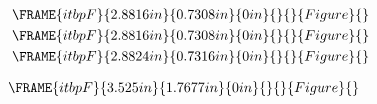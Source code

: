 \documentclass[notes=show]{beamer}
\begin{document}
\begin{frame}%

%
\begin{eqnarray*}
&&\FRAME{itbpF}{2.8816in}{0.7308in}{0in}{}{}{Figure}{\special{language
"Scientific Word";type "GRAPHIC";maintain-aspect-ratio TRUE;display
"USEDEF";valid_file "T";width 2.8816in;height 0.7308in;depth
0in;original-width 7.1356in;original-height 1.759in;cropleft "0";croptop
"1";cropright "1";cropbottom "0";tempfilename
'PEZY6C0A.wmf';tempfile-properties "XPR";}} \\
&&\FRAME{itbpF}{2.8816in}{0.7308in}{0in}{}{}{Figure}{\special{language
"Scientific Word";type "GRAPHIC";maintain-aspect-ratio TRUE;display
"USEDEF";valid_file "T";width 2.8816in;height 0.7308in;depth
0in;original-width 7.1373in;original-height 1.759in;cropleft "0";croptop
"1";cropright "1";cropbottom "0";tempfilename
'PEZY6R0B.wmf';tempfile-properties "XPR";}} \\
&&\FRAME{itbpF}{2.8824in}{0.7316in}{0in}{}{}{Figure}{\special{language
"Scientific Word";type "GRAPHIC";maintain-aspect-ratio TRUE;display
"USEDEF";valid_file "T";width 2.8824in;height 0.7316in;depth
0in;original-width 7.1356in;original-height 1.7599in;cropleft "0";croptop
"1";cropright "1";cropbottom "0";tempfilename
'PEZY6Z0C.wmf';tempfile-properties "XPR";}}
\end{eqnarray*}

\transboxout%
\end{frame}%

\begin{frame}%


\begin{equation*}
\FRAME{itbpF}{3.525in}{1.7677in}{0in}{}{}{Figure}{\special{language
"Scientific Word";type "GRAPHIC";maintain-aspect-ratio TRUE;display
"USEDEF";valid_file "T";width 3.525in;height 1.7677in;depth
0in;original-width 13.9857in;original-height 6.9583in;cropleft "0";croptop
"1";cropright "1";cropbottom "0";tempfilename
'PEZYF80H.bmp';tempfile-properties "XPR";}}
\end{equation*}

\transboxout%
\end{frame}%
\end{document}
